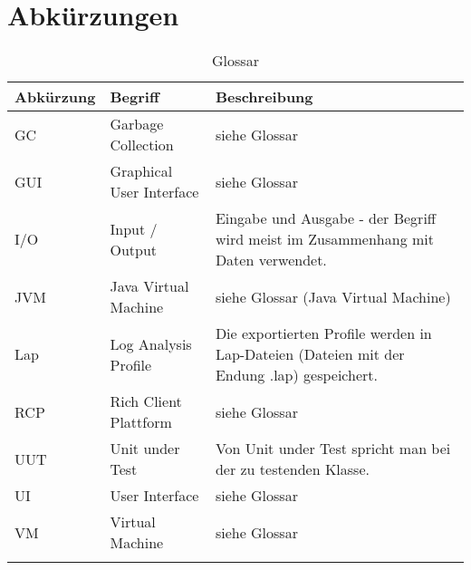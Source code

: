 \chapter*{Abkürzungen}\label{abkuerzungen}
  \begin{longtable}{|p{3cm}|p{5cm}|p{6.5cm}|}
\hline
  \textbf{Abkürzung} &\textbf{Begriff} &  \textbf{Beschreibung} \\\hline
  GC & Garbage Collection & siehe Glossar \\\hline
GUI & Graphical User Interface & siehe Glossar\\\hline
I/O & Input / Output & Eingabe und Ausgabe - der Begriff wird meist im Zusammenhang mit Daten verwendet.\\\hline
JVM & Java Virtual Machine & siehe Glossar (Java Virtual Machine)\\\hline
Lap & Log Analysis Profile & Die exportierten Profile werden in Lap-Dateien (Dateien mit der Endung .lap) gespeichert.\\\hline
RCP & Rich Client Plattform &siehe Glossar\\\hline
UUT & Unit under Test & Von Unit under Test spricht man bei der zu testenden Klasse.\\\hline
UI & User Interface & siehe Glossar \\\hline
VM & Virtual Machine &  siehe Glossar\\\hline
      \caption{Glossar}\\
  \end{longtable}



